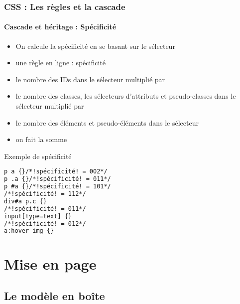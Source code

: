 \documentclass[xcolor=table]{beamer}
\begin{document}
\begin{frame}[fragile]
\frametitle{CSS : Les règles et la cascade}
\framesubtitle{Cascade et héritage : Spécificité}

\begin{minipage}{0.60\textwidth}
	\begin{itemize}
		\item On calcule la spécificité en se basant sur le sélecteur
		\item une règle en ligne : spécificité  
		\item le nombre des IDs dans le sélecteur multiplié par 
		\item le nombre des classes, les sélecteurs d'attributs et pseudo-classes dans le sélecteur multiplié par 
		\item le nombre des éléments et pseudo-éléments dans le sélecteur
		\item on fait la somme
	\end{itemize}
\end{minipage}
%
\begin{minipage}{0.38\textwidth}
\begin{exampleblock}{Exemple de spécificité}
\lstset{escapeinside=!!}
\scriptsize\bfseries
\begin{lstlisting}[language={html}]
p a {}/*!spécificité! = 002*/
p .a {}/*!spécificité! = 011*/
p #a {}/*!spécificité! = 101*/
/*!spécificité! = 112*/
div#a p.c {}
/*!spécificité! = 011*/
input[type=text] {}
/*!spécificité! = 012*/
a:hover img {}
\end{lstlisting}
\end{exampleblock}
\end{minipage}
\end{frame}

\section{Mise en page}

\subsection{Le modèle en boîte}
\end{document}
